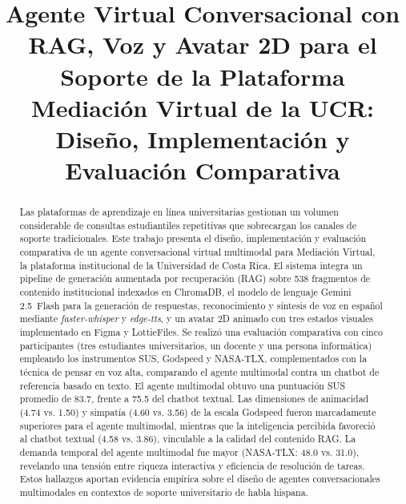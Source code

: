 \documentclass[conference]{IEEEtran}
\begin{document}
\title{Agente Virtual Conversacional con RAG, Voz y Avatar 2D para el Soporte de la Plataforma Mediación Virtual de la UCR: Diseño, Implementación y Evaluación Comparativa}


\author{
}

\maketitle

\begin{abstract}
Las plataformas de aprendizaje en línea universitarias gestionan un volumen considerable de consultas estudiantiles repetitivas que sobrecargan los canales de soporte tradicionales. Este trabajo presenta el diseño, implementación y evaluación comparativa de un agente conversacional virtual multimodal para Mediación Virtual, la plataforma institucional de la Universidad de Costa Rica. El sistema integra un pipeline de generación aumentada por recuperación (RAG) sobre 538 fragmentos de contenido institucional indexados en ChromaDB, el modelo de lenguaje Gemini 2.5~Flash para la generación de respuestas, reconocimiento y síntesis de voz en español mediante \textit{faster-whisper} y \textit{edge-tts}, y un avatar 2D animado con tres estados visuales implementado en Figma y LottieFiles. Se realizó una evaluación comparativa con cinco participantes (tres estudiantes universitarios, un docente y una persona informática) empleando los instrumentos SUS, Godspeed y NASA-TLX, complementados con la técnica de pensar en voz alta, comparando el agente multimodal contra un chatbot de referencia basado en texto. El agente multimodal obtuvo una puntuación SUS promedio de 83.7, frente a 75.5 del chatbot textual. Las dimensiones de animacidad (4.74 vs. 1.50) y simpatía (4.60 vs. 3.56) de la escala Godspeed fueron marcadamente superiores para el agente multimodal, mientras que la inteligencia percibida favoreció al chatbot textual (4.58 vs. 3.86), vinculable a la calidad del contenido RAG. La demanda temporal del agente multimodal fue mayor (NASA-TLX: 48.0 vs. 31.0), revelando una tensión entre riqueza interactiva y eficiencia de resolución de tareas. Estos hallazgos aportan evidencia empírica sobre el diseño de agentes conversacionales multimodales en contextos de soporte universitario de habla hispana.
\end{abstract}
\end{document}
